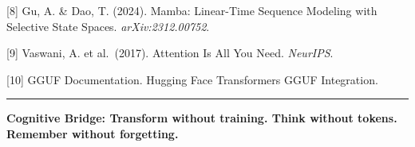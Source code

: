 \documentclass[
  11pt,
  a4paper,
]{article}
\begin{document}
{[}8{]} Gu, A. \& Dao, T. (2024). Mamba: Linear-Time Sequence Modeling
with Selective State Spaces. \emph{arXiv:2312.00752}.

{[}9{]} Vaswani, A. et al.~(2017). Attention Is All You Need.
\emph{NeurIPS}.

{[}10{]} GGUF Documentation. Hugging Face Transformers GGUF Integration.

\begin{center}\rule{0.5\linewidth}{0.5pt}\end{center}

\textbf{Cognitive Bridge: Transform without training. Think without
tokens. Remember without forgetting.}
\end{document}
